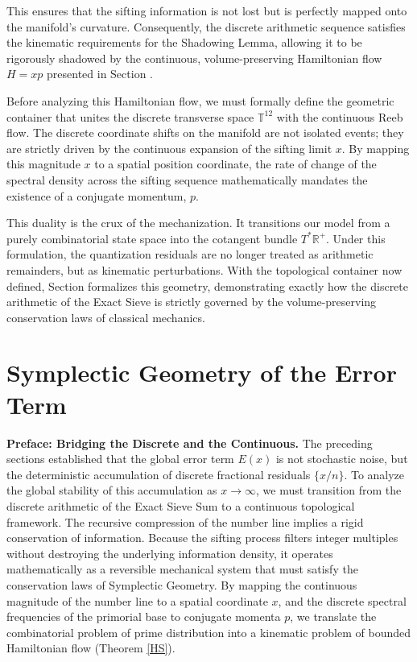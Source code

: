 \documentclass[sn-mathphys-num, pdflatex]{sn-jnl}
\begin{document}
This ensures that the sifting information is not lost but is perfectly mapped onto the manifold's curvature. Consequently, the discrete arithmetic sequence satisfies the kinematic requirements for the Shadowing Lemma, allowing it to be rigorously shadowed by the continuous, volume-preserving Hamiltonian flow $H=xp$ presented in Section .

Before analyzing this Hamiltonian flow, we must formally define the geometric container that unites the discrete transverse space $\mathbb{T}^{12}$ with the continuous Reeb flow. The discrete coordinate shifts on the manifold are not isolated events; they are strictly driven by the continuous expansion of the sifting limit $x$. By mapping this magnitude $x$ to a spatial position coordinate, the rate of change of the spectral density across the sifting sequence mathematically mandates the existence of a conjugate momentum, $p$. 

This duality is the crux of the mechanization. It transitions our model from a purely combinatorial state space into the cotangent bundle $T^*\mathbb{R}^+$. Under this formulation, the quantization residuals are no longer treated as arithmetic remainders, but as kinematic perturbations. With the topological container now defined, Section  formalizes this geometry, demonstrating exactly how the discrete arithmetic of the Exact Sieve is strictly governed by the volume-preserving conservation laws of classical mechanics.
\section{Symplectic Geometry of the Error Term}
\label{SG}
\textbf{Preface: Bridging the Discrete and the Continuous.} The preceding sections established that the global error term $E(x)$ is not stochastic noise, but the deterministic accumulation of discrete fractional residuals $\{x/n\}$. To analyze the global stability of this accumulation as $x \rightarrow \infty$, we must transition from the discrete arithmetic of the Exact Sieve Sum to a continuous topological framework. The recursive compression of the number line implies a rigid conservation of information. Because the sifting process filters integer multiples without destroying the underlying information density, it operates mathematically as a reversible mechanical system that must satisfy the conservation laws of Symplectic Geometry. By mapping the continuous magnitude of the number line to a spatial coordinate $x$, and the discrete spectral frequencies of the primorial base to conjugate momenta $p$, we translate the combinatorial problem of prime distribution into a kinematic problem of bounded Hamiltonian flow (Theorem \ref{HS}).
\end{document}

